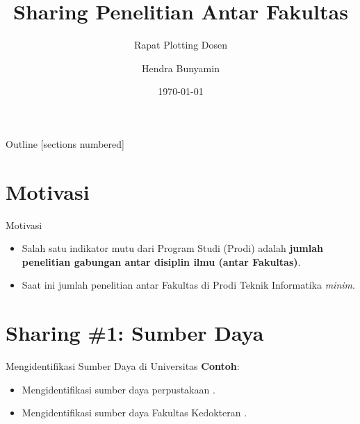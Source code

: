 \documentclass[10pt,xcolor=svgnames]{beamer} %
\title{Sharing Penelitian Antar Fakultas}
\author[Name]{Hendra Bunyamin} %
\subtitle{Rapat Plotting Dosen}
\date{\today} %
\begin{document}
{
\maketitle
}%


\begin{frame}{Outline}
  [sections numbered] %
  \tableofcontents[hideallsubsections] %
\end{frame}

\section{Motivasi}
\begin{frame}{Motivasi}
\begin{itemize}
	\item<2-> Salah satu indikator mutu dari Program Studi (Prodi) adalah \textbf{jumlah penelitian gabungan antar disiplin ilmu (antar Fakultas)}.
	\item<3-> Saat ini jumlah penelitian antar Fakultas di Prodi Teknik Informatika \textit{minim}.
\end{itemize}
\end{frame}

\section{Sharing \#1: Sumber Daya}
\begin{frame}{Mengidentifikasi Sumber Daya di Universitas}
	\textbf{Contoh}:
	\begin{itemize}
		\item<2-> Mengidentifikasi sumber daya perpustakaan \citep{bunyamin2017automatic,bunyamin2019topic}.
		\item<3-> Mengidentifikasi sumber daya Fakultas Kedokteran \citep{bunyamin2021breast}.
	\end{itemize}
\end{frame}
\end{document}
